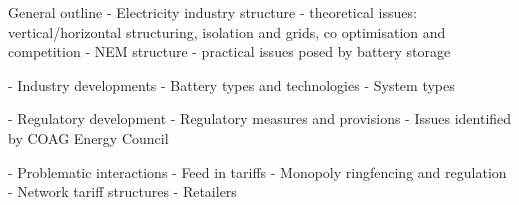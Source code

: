 
General outline
- Electricity industry structure
    - theoretical issues: vertical/horizontal structuring, isolation and grids, co optimisation and competition
    - NEM structure
    - practical issues posed by battery storage
    
- Industry developments
    - Battery types and technologies
    - System types

- Regulatory development
    - Regulatory measures and provisions
    - Issues identified by COAG Energy Council

- Problematic interactions
    - Feed in tariffs
    - Monopoly ringfencing and regulation
    - Network tariff structures
    - Retailers
    
    
